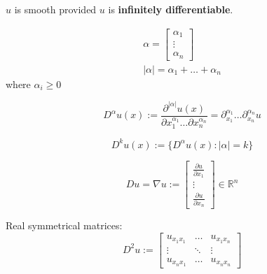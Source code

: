 \documentclass{blog}
\begin{document}
\begin{definition}[smooth]
    $u$ is smooth provided $u$ is \textbf{infinitely differentiable}.
\end{definition}

\begin{definition}
    \begin{gather}
        \label{eq:alpha}
        \alpha = \begin{bmatrix} \alpha_{1} \\ \vdots \\ \alpha_{n} \end{bmatrix} \\
        \label{eq:|alpha|}
        |\alpha| = \alpha_{1} + \ldots + \alpha_{n}
    \end{gather}
    where $\alpha_{i} \geq 0$
\end{definition}

\begin{definition}[$D^{\alpha}$]
    \begin{equation}
        \label{eq:D-alpha}
        D^{\alpha} u(x) := \frac{\partial^{|\alpha|} u(x)}{\partial x_{1}^{\alpha_{1}} \ldots \partial x_{n}^{\alpha_{n}}}
        = \partial_{x_{1}}^{\alpha_{1}} \ldots \partial_{x_{n}}^{\alpha_{n}} u
    \end{equation}
\end{definition}

\begin{definition}[$D^{k}$]
    \begin{equation}
        \label{eq:Dk}
        D^{k} u(x) := \{D^{\alpha} u(x) : |\alpha| = k\}
    \end{equation}
\end{definition}

\begin{definition}
    \begin{equation}
        \label{eq:D}
        Du = \nabla u :=
        \begin{bmatrix}
            \frac{\partial u}{\partial x_{1}} \\
            \vdots                            \\
            \frac{\partial u}{\partial x_{n}}
        \end{bmatrix}
        \in \mathbb{R}^{n}
    \end{equation}
\end{definition}

\begin{definition}
    Real symmetrical matrices:
    \begin{equation}
        \label{eq:D2}
        D^{2}u :=
        \begin{bmatrix}
            u_{x_{1}x_{1}} & \dots  & u_{x_{1}x_{n}} \\
            \vdots         & \ddots & \vdots         \\
            u_{x_{n}x_{1}} & \dots  & u_{x_{n}x_{n}}
        \end{bmatrix}
    \end{equation}
\end{definition}
\end{document}
